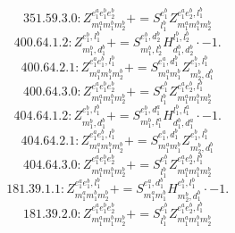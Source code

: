 \documentclass[letterpaper,10pt,fleqn,leqno,onecolumn]{article}
\begin{document}
\begin{equation} \;\;\;\;\;\;  351.59.3.0: Z^{e_{1}^{a}e_{1}^{b}e_{2}^{b}}_{m_{1}^{a}m_{1}^{b}m_{2}^{b}}+=S^{e_{1}^{b}}_{l_{1}^{b}}Z^{e_{1}^{a}e_{2}^{b},l_{1}^{b}}_{m_{1}^{a}m_{1}^{b}m_{2}^{b}} \end{equation}
\begin{equation} \;\;\;\;\;\;  400.64.1.2: Z^{e_{1}^{b},l_{1}^{b}}_{m_{1}^{b},d_{1}^{b}}+=S^{e_{1}^{b},d_{2}^{b}}_{m_{1}^{b},l_{2}^{b}}H^{l_{1}^{b},l_{2}^{b}}_{d_{1}^{b},d_{2}^{b}}\cdot -1. \end{equation}
\begin{equation} \;\;\;\;\;\;  400.64.2.1: Z^{e_{1}^{a}e_{1}^{b},l_{1}^{b}}_{m_{1}^{a}m_{1}^{b}m_{2}^{b}}+=S^{e_{1}^{a},d_{1}^{b}}_{m_{1}^{a}m_{1}^{b}}Z^{e_{1}^{b},l_{1}^{b}}_{m_{2}^{b},d_{1}^{b}} \end{equation}
\begin{equation} \;\;\;\;\;\;  400.64.3.0: Z^{e_{1}^{a}e_{1}^{b}e_{2}^{b}}_{m_{1}^{a}m_{1}^{b}m_{2}^{b}}+=S^{e_{1}^{b}}_{l_{1}^{b}}Z^{e_{1}^{a}e_{2}^{b},l_{1}^{b}}_{m_{1}^{a}m_{1}^{b}m_{2}^{b}} \end{equation}
\begin{equation} \;\;\;\;\;\;  404.64.1.2: Z^{e_{1}^{b},l_{1}^{b}}_{m_{1}^{b},d_{1}^{b}}+=S^{e_{1}^{b},d_{1}^{a}}_{m_{1}^{b},l_{1}^{a}}H^{l_{1}^{b},l_{1}^{a}}_{d_{1}^{b},d_{1}^{a}}\cdot -1. \end{equation}
\begin{equation} \;\;\;\;\;\;  404.64.2.1: Z^{e_{1}^{a}e_{1}^{b},l_{1}^{b}}_{m_{1}^{a}m_{1}^{b}m_{2}^{b}}+=S^{e_{1}^{a},d_{1}^{b}}_{m_{1}^{a}m_{1}^{b}}Z^{e_{1}^{b},l_{1}^{b}}_{m_{2}^{b},d_{1}^{b}} \end{equation}
\begin{equation} \;\;\;\;\;\;  404.64.3.0: Z^{e_{1}^{a}e_{1}^{b}e_{2}^{b}}_{m_{1}^{a}m_{1}^{b}m_{2}^{b}}+=S^{e_{1}^{b}}_{l_{1}^{b}}Z^{e_{1}^{a}e_{2}^{b},l_{1}^{b}}_{m_{1}^{a}m_{1}^{b}m_{2}^{b}} \end{equation}
\begin{equation} \;\;\;\;\;\;  181.39.1.1: Z^{e_{1}^{a}e_{1}^{b},l_{1}^{b}}_{m_{1}^{a}m_{1}^{b}m_{2}^{b}}+=S^{e_{1}^{a},d_{1}^{b}}_{m_{1}^{a}m_{1}^{b}}H^{e_{1}^{b},l_{1}^{b}}_{m_{2}^{b},d_{1}^{b}}\cdot -1. \end{equation}
\begin{equation} \;\;\;\;\;\;  181.39.2.0: Z^{e_{1}^{a}e_{1}^{b}e_{2}^{b}}_{m_{1}^{a}m_{1}^{b}m_{2}^{b}}+=S^{e_{1}^{b}}_{l_{1}^{b}}Z^{e_{1}^{a}e_{2}^{b},l_{1}^{b}}_{m_{1}^{a}m_{1}^{b}m_{2}^{b}} \end{equation}
\end{document}
